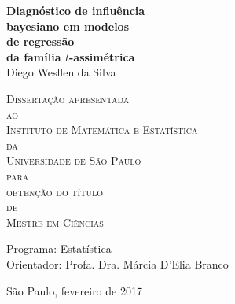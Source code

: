 \documentclass[12pt,twoside,a4paper]{book}
\begin{document}
\frontmatter 
\fancyhead[RO]{{\footnotesize\rightmark}\hspace{2em}\thepage}
\setcounter{tocdepth}{2}
\fancyhead[LE]{\thepage\hspace{2em}\footnotesize{\leftmark}}
\fancyhead[RE,LO]{}
\fancyhead[RO]{{\footnotesize\rightmark}\hspace{2em}\thepage}

\onehalfspacing  %

\thispagestyle{empty}
\begin{center}
    \vspace*{2.3cm}
    \Large{\textbf{Diagnóstico de influência\\
    bayesiano em modelos\\
    de regressão \\
    da família $t$-assimétrica}}\\
    
    \vspace*{1.2cm}
    \Large{Diego Wesllen da Silva}
    
    \vskip 2cm
    \textsc{
    Dissertação apresentada\\[-0.25cm] 
    ao\\[-0.25cm]
    Instituto de Matemática e Estatística\\[-0.25cm]
    da\\[-0.25cm]
    Universidade de São Paulo\\[-0.25cm]
    para\\[-0.25cm]
    obtenção do título\\[-0.25cm]
    de\\[-0.25cm]
    Mestre em Ciências}
    
    \vskip 1.5cm
    Programa: Estatística\\
    Orientador: Profa. Dra. Márcia D'Elia Branco

   	\vskip 1cm
    \normalsize{}
    
    \vskip 0.5cm
    \normalsize{São Paulo, fevereiro de 2017}
\end{center}
\end{document}
